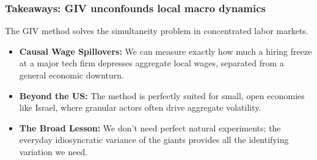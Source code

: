 \documentclass[aspectratio=169,11pt]{beamer}
\begin{document}
\begin{frame}
    \frametitle{Takeaways: GIV unconfounds local macro dynamics}

    \vspace{1cm}
    {\Large
        The GIV method solves the simultaneity problem in concentrated labor markets.
    }

    \vspace{1cm}
    \begin{itemize}
        \item \textbf{Causal Wage Spillovers:} We can measure exactly how much a hiring freeze at a major tech firm depresses aggregate local wages, separated from a general economic downturn.
        \item \textbf{Beyond the US:} The method is perfectly suited for small, open economies like Israel, where granular actors often drive aggregate volatility.
        \item \textbf{The Broad Lesson:} We don't need perfect natural experiments; the everyday idiosyncratic variance of the giants provides all the identifying variation we need.
    \end{itemize}
\end{frame}
\end{document}
